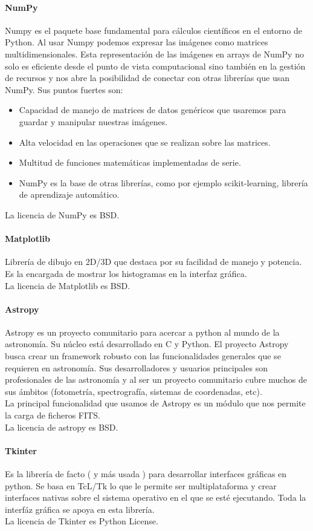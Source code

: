 	\paragraph{NumPy}
	Numpy es el paquete base fundamental para cálculos científicos en el entorno de Python. Al usar Numpy podemos expresar las imágenes como matrices multidimensionales. Esta representación de las imágenes en arrays de NumPy no solo es eficiente desde el punto de vista computacional sino también en la gestión de recursos y nos abre la posibilidad de conectar con otras librerías que usan NumPy. Sus puntos fuertes son:
	\begin{itemize}
		\item Capacidad de manejo de matrices de datos genéricos que usaremos para guardar y manipular nuestras imágenes.
		\item Alta velocidad en las operaciones que se realizan sobre las matrices.
		\item Multitud de funciones matemáticas implementadas de serie.
		\item NumPy es la base de otras librerías, como por ejemplo scikit-learning, librería de aprendizaje automático.
	\end{itemize}
	La licencia de NumPy es BSD.
	\paragraph{Matplotlib}
	Librería de dibujo en 2D/3D que destaca por su facilidad de manejo y potencia. Es la encargada de mostrar los histogramas en la interfaz gráfica.\\
	La licencia de Matplotlib es BSD.
	\paragraph{Astropy}
	Astropy es un proyecto comunitario para acercar a python al mundo de la astronomía. Su núcleo está desarrollado en C y Python. El proyecto Astropy busca crear un framework robusto con las funcionalidades generales que se requieren en astronomía. Sus desarrolladores y usuarios principales son profesionales de las astronomía y al ser un proyecto comunitario cubre muchos de sus ámbitos (fotometría, spectrografía, sistemas de coordenadas, etc).\\
	La principal funcionalidad que usamos de Astropy es un módulo que nos permite la carga de ficheros FITS.\\
	La licencia de astropy es BSD.\\
	\paragraph{Tkinter}
	Es la librería de facto ( y más usada ) para desarrollar interfaces gráficas en python. Se basa en TcL/Tk lo que le permite ser multiplataforma y crear interfaces nativas sobre el sistema operativo en el que se esté ejecutando. Toda la interfáz gráfica se apoya en esta librería.\\	
	La licencia de Tkinter es Python License.
	\vfill
	\newpage
